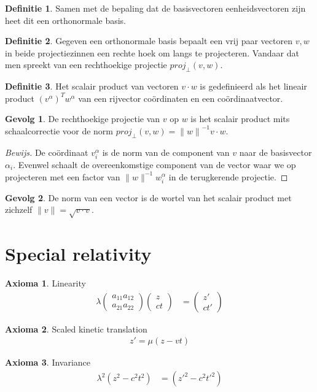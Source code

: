 \documentclass{amsart}
\theoremstyle{definition}
\newtheorem{axm}{Axioma}[section]
\newtheorem{dfn}{Definitie}[section]
\newtheorem{csq}{Gevolg}[section]
\newenvironment{bewijs}{\begin{proof}[Bewijs]}{\end{proof}}
\newcommand{\norm}[1]{\lVert#1\rVert}
\begin{document}
\begin{dfn}
	Samen met de bepaling dat de basisvectoren eenheidsvectoren zijn heet dit een orthonormale basis.
\end{dfn}

\begin{dfn}
	Gegeven een orthonormale basis bepaalt een vrij paar vectoren $v, w$ in beide projectiezinnen een rechte hoek om langs te projecteren.
	Vandaar dat men spreekt van een rechthoekige projectie $proj_\perp(v, w)$.
\end{dfn}

\begin{dfn}
	Het scalair product van vectoren $v \cdot w$ is gedefinieerd als het lineair product $(v^\alpha)^T w^\alpha$ van een rijvector coördinaten en een coördinaatvector.
\end{dfn}

\begin{csq}
	De rechthoekige projectie van $v$ op $w$ is het scalair product mits schaalcorrectie voor de norm $proj_\perp(v, w) = {\norm w}^{-1}v \cdot w$.
	\begin{bewijs}
		De coördinaat $v^\alpha_i$ is de norm van de component van $v$ naar de basisvector $\alpha_i$. Evenwel schaalt de overeenkomstige component van de vector waar we op projecteren met een factor van $\norm w^{-1}w^\alpha_i$ in de terugkerende projectie.
	\end{bewijs}
\end{csq}

\begin{csq}
	De norm van een vector is de wortel van het scalair product met zichzelf $\norm v = \sqrt{v\cdot v}$.
\end{csq}

\newpage

\section{Special relativity}
\begin{axm}
	Linearity
	\begin{align*}
		\lambda
		\begin{pmatrix}
			a_{11} a_{12} \\
			a_{21} a_{22}
		\end{pmatrix}
		\begin{pmatrix}
			z \\
			ct
		\end{pmatrix}
		 & =
		\begin{pmatrix}
			z' \\
			ct'
		\end{pmatrix}
	\end{align*}
\end{axm}
\begin{axm}
	Scaled kinetic translation
	\begin{align*}
		z' = \mu(z - vt)
	\end{align*}
\end{axm}
\begin{axm}
	Invariance
	\begin{align*}
		\lambda^2(z^2 - c^2t^2) & = ({z'}^2 - c^2{t'}^2)
	\end{align*}
\end{axm}
\end{document}
